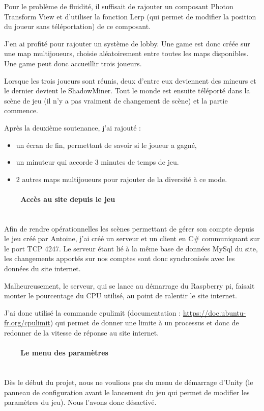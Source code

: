 \documentclass[titlepage, 13px, a4paper]{report}
\begin{document}
Pour le problème de fluidité, il suffisait de rajouter un composant Photon Transform View et d’utiliser la 
fonction Lerp (qui permet de modifier la position du joueur sans téléportation) de ce composant.

J’en ai profité pour rajouter un système de lobby. Une game est donc créée sur une map multijoueurs, choisie 
aléatoirement entre toutes les maps disponibles. Une game peut donc accueillir trois joueurs.

Lorsque les trois joueurs sont réunis, deux d'entre eux deviennent des mineurs et le dernier devient le ShadowMiner.
Tout le monde est ensuite téléporté dans la scène de jeu (il n’y a pas vraiment de changement de scène) et la partie commence.

Après la deuxième soutenance, j’ai rajouté : \\
{\begin{itemize}
	\item un écran de fin, permettant de savoir si le joueur a gagné,
	\item un minuteur qui accorde 3 minutes de temps de jeu.
	\item 2 autres maps multijoueurs pour rajouter de la diversité à ce mode. \\
\end{itemize}}

\paragraph{~~~~Accès au site depuis le jeu} \hspace{0pt} \\
Afin de rendre opérationnelles les scènes permettant de gérer son compte depuis le jeu créé par Antoine,
j’ai créé un serveur et un client en C\# communiquant sur le port TCP 4247. Le serveur étant lié à la même 
base de données MySql du site, les changements apportés sur nos comptes sont donc synchronisés avec les données du site internet.

Malheureusement, le serveur, qui se lance au démarrage du Raspberry pi, faisait monter le pourcentage 
du CPU utilisé, au point de ralentir le site internet.

J’ai donc utilisé la commande cpulimit (documentation : \url{https://doc.ubuntu-fr.org/cpulimit}) qui permet de donner une 
limite à un processus et donc de redonner de la vitesse de réponse au site internet. \\


\paragraph{~~~~Le menu des paramètres} \hspace{0pt} \\
Dès le début du projet, nous ne voulions pas du menu de démarrage d’Unity (le panneau de configuration avant 
le lancement du jeu qui permet de modifier les paramètres du jeu). Nous l’avons donc désactivé. \\
\end{document}
